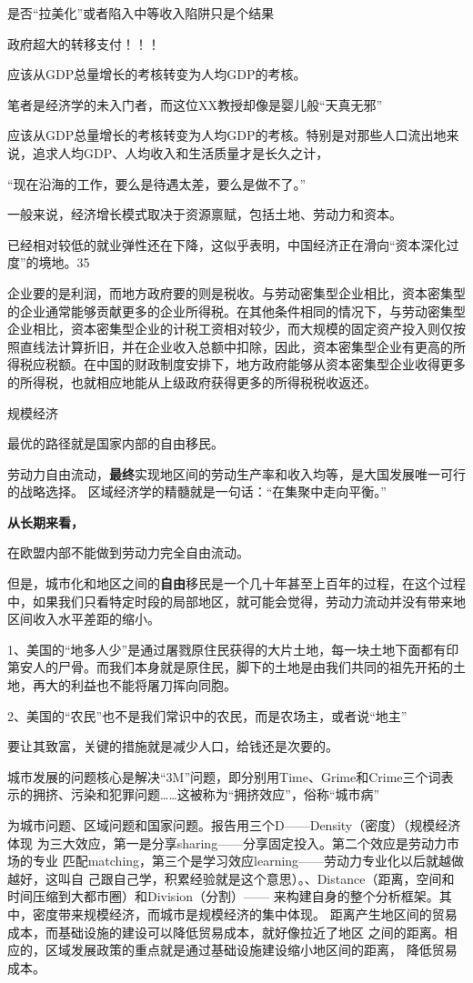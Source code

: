 是否“拉美化”或者陷入中等收入陷阱只是个结果

政府超大的转移支付！！！

应该从GDP总量增长的考核转变为人均GDP的考核。

笔者是经济学的未入门者，而这位XX教授却像是婴儿般“天真无邪”

应该从GDP总量增长的考核转变为人均GDP的考核。特别是对那些人口流出地来说，追求人均GDP、人均收入和生活质量才是长久之计，

“现在沿海的工作，要么是待遇太差，要么是做不了。”

一般来说，经济增长模式取决于资源禀赋，包括土地、劳动力和资本。

已经相对较低的就业弹性还在下降，这似乎表明，中国经济正在滑向“资本深化过度”的境地。35

企业要的是利润，而地方政府要的则是税收。与劳动密集型企业相比，资本密集型的企业通常能够贡献更多的企业所得税。在其他条件相同的情况下，与劳动密集型企业相比，资本密集型企业的计税工资相对较少，而大规模的固定资产投入则仅按照直线法计算折旧，并在企业收入总额中扣除，因此，资本密集型企业有更高的所得税应税额。在中国的财政制度安排下，地方政府能够从资本密集型企业收得更多的所得税，也就相应地能从上级政府获得更多的所得税税收返还。


规模经济

最优的路径就是国家内部的自由移民。

劳动力自由流动，{\bf 最终}实现地区间的劳动生产率和收入均等，是大国发展唯一可行的战略选择。
区域经济学的精髓就是一句话：“在集聚中走向平衡。”

{\bf 从长期来看，}

在欧盟内部不能做到劳动力完全自由流动。


但是，城市化和地区之间的{\bf 自由}移民是一个几十年甚至上百年的过程，在这个过程中，如果我们只看特定时段的局部地区，就可能会觉得，劳动力流动并没有带来地区间收入水平差距的缩小。

1、美国的“地多人少”是通过屠戮原住民获得的大片土地，每一块土地下面都有印第安人的尸骨。而我们本身就是原住民，脚下的土地是由我们共同的祖先开拓的土地，再大的利益也不能将屠刀挥向同胞。

2、美国的“农民”也不是我们常识中的农民，而是农场主，或者说“地主”

要让其致富，关键的措施就是减少人口，给钱还是次要的。

城市发展的问题核心是解决“3M”问题，即分别用Time、Grime和Crime三个词表示的拥挤、污染和犯罪问题……这被称为“拥挤效应”，俗称“城市病”

为城市问题、区域问题和国家问题。报告用三个D——Density（密度）（规模经济体现
为三大效应，第一是分享sharing——分享固定投入。第二个效应是劳动力市场的专业
匹配matching，第三个是学习效应learning——劳动力专业化以后就越做越好，这叫自
己跟自己学，积累经验就是这个意思）。、Distance（距离，空间和时间压缩到大都市圈）和Division（分割）——
来构建自身的整个分析框架。其中，密度带来规模经济，而城市是规模经济的集中体现。
距离产生地区间的贸易成本，而基础设施的建设可以降低贸易成本，就好像拉近了地区
之间的距离。相应的，区域发展政策的重点就是通过基础设施建设缩小地区间的距离，
降低贸易成本。

